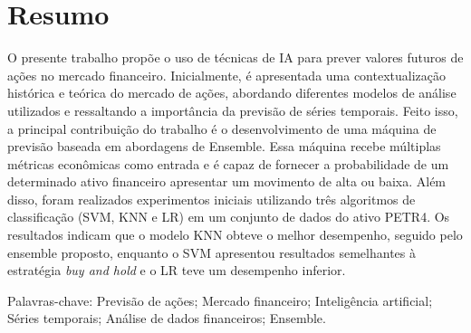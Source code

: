 \chapter*{Resumo}

\noindent 
O presente trabalho propõe o uso de técnicas de IA para prever valores futuros de ações no mercado financeiro. Inicialmente, é apresentada uma contextualização histórica e teórica do mercado de ações, abordando diferentes modelos de análise utilizados e ressaltando a importância da previsão de séries temporais. Feito isso, a principal contribuição do trabalho é o desenvolvimento de uma máquina de previsão baseada em abordagens de Ensemble. Essa máquina recebe múltiplas métricas econômicas como entrada e é capaz de fornecer a probabilidade de um determinado ativo financeiro apresentar um movimento de alta ou baixa. Além disso, foram realizados experimentos iniciais utilizando três algoritmos de classificação (SVM, KNN e LR) em um conjunto de dados do ativo PETR4. Os resultados indicam que o modelo KNN obteve o melhor desempenho, seguido pelo ensemble proposto, enquanto o SVM apresentou resultados semelhantes à estratégia \textit{buy and hold} e o LR teve um desempenho inferior.

\vfill%
\noindent Palavras-chave: Previsão de ações; Mercado financeiro; Inteligência artificial; Séries temporais; Análise de dados financeiros; Ensemble.

